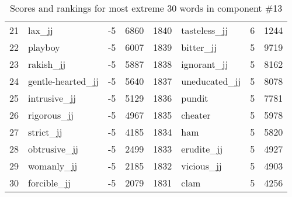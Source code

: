 \begin{table}[tbp]
\begin{tabular}{| rlr@{.}l | rlr@{.}l |}
    21 & lax\_jj & -5 & 6860    &    1840 & tasteless\_jj & 6 & 1244 \\
    22 & playboy & -5 & 6007    &    1839 & bitter\_jj & 5 & 9719 \\
    23 & rakish\_jj & -5 & 5887    &    1838 & ignorant\_jj & 5 & 8162 \\
    24 & gentle-hearted\_jj & -5 & 5640    &    1837 & uneducated\_jj & 5 & 8078 \\
    25 & intrusive\_jj & -5 & 5129    &    1836 & pundit & 5 & 7781 \\
    26 & rigorous\_jj & -5 & 4967    &    1835 & cheater & 5 & 5978 \\
    27 & strict\_jj & -5 & 4185    &    1834 & ham & 5 & 5820 \\
    28 & obtrusive\_jj & -5 & 2499    &    1833 & erudite\_jj & 5 & 4927 \\
    29 & womanly\_jj & -5 & 2185    &    1832 & vicious\_jj & 5 & 4903 \\
    30 & forcible\_jj & -5 & 2079    &    1831 & clam & 5 & 4256 \\
    \hline
    \end{tabular}
    \caption{Scores and rankings for most extreme 30 words in component \#13} 
\end{table}
\clearpage
